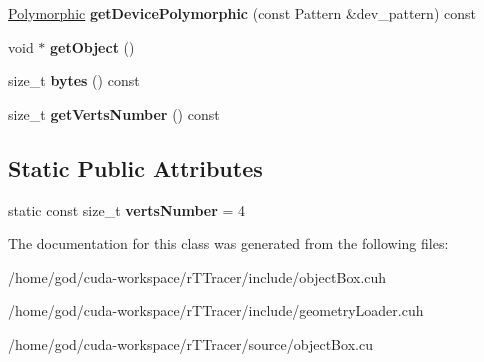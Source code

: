 \begin{DoxyCompactItemize}
\item 
\hyperlink{struct_polymorphic}{Polymorphic} {\bfseries get\+Device\+Polymorphic} (const Pattern \&dev\+\_\+pattern) const\hypertarget{class_plane_a67ce79f9411d96c278f0a3e7c2438f11}{}\label{class_plane_a67ce79f9411d96c278f0a3e7c2438f11}

\item 
void $\ast$ {\bfseries get\+Object} ()\hypertarget{class_plane_a08c227ed62b3b57f47cffea0021f3f76}{}\label{class_plane_a08c227ed62b3b57f47cffea0021f3f76}

\item 
size\+\_\+t {\bfseries bytes} () const\hypertarget{class_plane_a8a95c1d089d188c4c927bc67e5139775}{}\label{class_plane_a8a95c1d089d188c4c927bc67e5139775}

\item 
size\+\_\+t {\bfseries get\+Verts\+Number} () const\hypertarget{class_plane_aecf40d0480c922b6513be086f1a732a7}{}\label{class_plane_aecf40d0480c922b6513be086f1a732a7}

\end{DoxyCompactItemize}
\subsection*{Static Public Attributes}
\begin{DoxyCompactItemize}
\item 
static const size\+\_\+t {\bfseries verts\+Number} = 4\hypertarget{class_plane_aff3d918e972fc3bc83c71b67147bb02a}{}\label{class_plane_aff3d918e972fc3bc83c71b67147bb02a}

\end{DoxyCompactItemize}


The documentation for this class was generated from the following files\+:\begin{DoxyCompactItemize}
\item 
/home/god/cuda-\/workspace/r\+T\+Tracer/include/object\+Box.\+cuh\item 
/home/god/cuda-\/workspace/r\+T\+Tracer/include/geometry\+Loader.\+cuh\item 
/home/god/cuda-\/workspace/r\+T\+Tracer/source/object\+Box.\+cu\end{DoxyCompactItemize}
